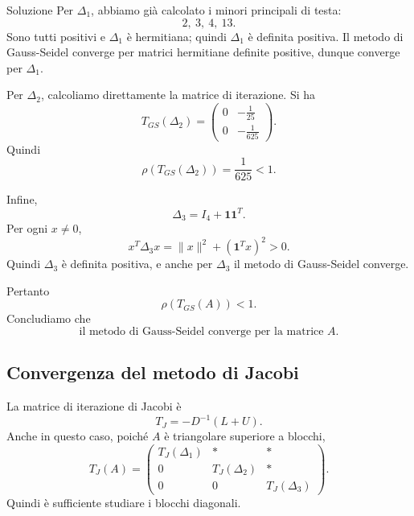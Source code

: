 \documentclass[a4paper]{article}
\begin{document}
\begin{snippetsolution}{Soluzione}
    Per \(\Delta_1\), abbiamo già calcolato i minori principali di testa:
    \[
        2,\ 3,\ 4,\ 13.
    \]
    Sono tutti positivi e \(\Delta_1\) è hermitiana; quindi \(\Delta_1\) è definita positiva. Il metodo di Gauss-Seidel converge per matrici hermitiane definite positive, dunque converge per \(\Delta_1\).

    Per \(\Delta_2\), calcoliamo direttamente la matrice di iterazione. Si ha
    \[
        T_{GS}(\Delta_2)=
        \begin{pmatrix}
            0 & -\frac{1}{25}\\
            0 & -\frac{1}{625}
        \end{pmatrix}.
    \]
    Quindi
    \[
        \rho(T_{GS}(\Delta_2))=\frac{1}{625}<1.
    \]

    Infine,
    \[
        \Delta_3=I_4+\mathbf{1}\mathbf{1}^T.
    \]
    Per ogni \(x\neq 0\),
    \[
        x^T\Delta_3x
        =
        \|x\|^2+(\mathbf{1}^Tx)^2>0.
    \]
    Quindi \(\Delta_3\) è definita positiva, e anche per \(\Delta_3\) il metodo di Gauss-Seidel converge.

    Pertanto
    \[
        \rho(T_{GS}(A))<1.
    \]
    Concludiamo che
    \[
        \text{il metodo di Gauss-Seidel converge per la matrice } A.
    \]

    \subsection*{Convergenza del metodo di Jacobi}

    La matrice di iterazione di Jacobi è
    \[
        T_J=-D^{-1}(L+U).
    \]
    Anche in questo caso, poiché \(A\) è triangolare superiore a blocchi,
    \[
        T_J(A)=
        \begin{pmatrix}
            T_J(\Delta_1) & * & *\\
            0 & T_J(\Delta_2) & *\\
            0 & 0 & T_J(\Delta_3)
        \end{pmatrix}.
    \]
    Quindi è sufficiente studiare i blocchi diagonali.


\end{snippetsolution}
\end{document}
